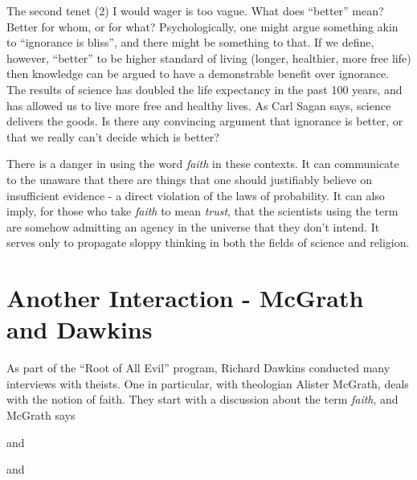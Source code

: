 The second tenet (2) I would wager is too vague. What does ``better''
mean? Better for whom, or for what? Psychologically, one might argue
something akin to ``ignorance is bliss'', and there might be something
to that. If we define, however, ``better'' to be higher standard of
living (longer, healthier, more free life) then knowledge can be argued
to have a demonstrable benefit over ignorance. The results of science
has doubled the life expectancy in the past 100 years, and has allowed
us to live more free and healthy lives.  As Carl Sagan says, science delivers the
goods. Is there any convincing argument that ignorance is better, or
that we really can't decide which is better? 

There is a danger in using the word {\em faith} in these contexts.  It can communicate to the unaware that there are things that one should justifiably believe on insufficient evidence - a direct violation of the laws of probability.  It can also imply, for those who take {\em faith} to mean {\em trust}, that the scientists using the term are somehow admitting an agency in the universe that they don't intend.  It serves only to propagate sloppy thinking in both the fields of science and religion.

\section{Another Interaction - McGrath and Dawkins}

As part of the ``Root of All Evil'' program, Richard Dawkins conducted many interviews with theists.  One in particular, with theologian Alister McGrath, deals with the notion of faith\cite{Dawkins:aa}.  They start with a discussion about the term \emph{faith}, and McGrath
says


and


and


